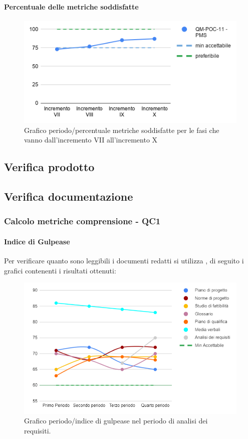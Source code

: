 \paragraph{Percentuale delle metriche soddisfatte}
\begin{figure}[H]
			\centering
			\includegraphics[width=0.8\linewidth]{./res/images/QM-PROC-11-PMS.png}
			\caption{Grafico periodo/percentuale metriche soddisfatte per le fasi che vanno dall'incremento VII all'incremento X}
			\label{fig:Grafico periodo/percentuale metriche soddisfatte per le fasi che vanno dall'incremento VII all'incremento X}
	\end{figure}

\subsection{Verifica prodotto}


\subsection{Verifica documentazione}

\subsubsection{Calcolo metriche comprensione - QC1}

\paragraph{Indice di Gulpease}
Per verificare quanto sono leggibili i documenti redatti si utilizza , di seguito i grafici contenenti i risultati ottenuti:

\begin{figure}[H]
	\centering
	\includegraphics[width=0.8\linewidth]{./res/images/gulpease_1.png}
	\caption{Grafico periodo/indice di gulpease nel periodo di analisi dei requisiti.}
	\label{fig:Grafico indice di gulpease periodo di analisi dei requisiti.}
\end{figure}

